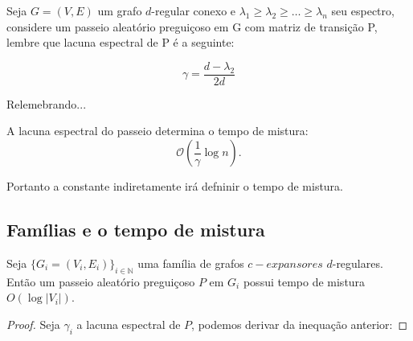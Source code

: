 \begin{frame}
  Seja $G=(V,E)$ um grafo $d$-regular conexo e $\lambda_1\ge \lambda_2 \ge \dots
  \ge \lambda_n$ seu espectro, considere um passeio aleatório
  preguiçoso em G com matriz de transição P, lembre que lacuna espectral de P é a seguinte:

\[
\gamma = \frac{d-\lambda_2}{2d}
\]


\end{frame}

\begin{frame}{Relemebrando...}
  \begin{center}
  A lacuna espectral do passeio determina o tempo de mistura:
\[
  \mathcal{O}\!\left(\frac{1}{\gamma}\log n\right).
\]

Portanto a constante indiretamente irá defninir o tempo de mistura.

\vspace{20pt}
  \end{center}
\end{frame}

\subsection{Famílias e o tempo de mistura}
\begin{frame}
\begin{theorem}
Seja $\{G_i=(V_i, E_i)\}_{i\in\mathbb{N}}$ uma família de grafos $c-expansores$
$d$-regulares. Então um passeio aleatório preguiçoso $P$ em $G_i$ possui tempo de
mistura $ O(\log |V_i|)$.
\end{theorem}
\end{frame}

\begin{frame}
  \begin{proof}
    Seja $\gamma_i$ a lacuna espectral de $P$, podemos derivar da inequação
    anterior:
  \end{proof}
\end{frame}

